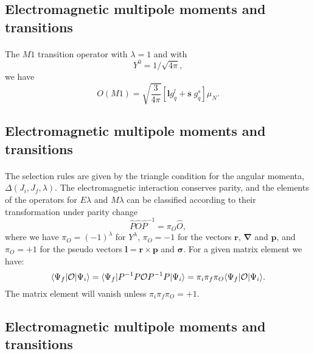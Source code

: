 \documentclass[%
twoside,                 %
final,                   %
10pt]{article}
\begin{document}
\subsection*{Electromagnetic multipole moments and transitions}

\paragraph{}
The $M1$ transition operator with $\lambda=1$ and with
\[
  Y^{0}=1/\sqrt{4\pi },
\]
we have
\[
O(M1)=\sqrt{\frac{3}{4\pi }}[\mathbf{l}g^{l }_{q}+\mathbf{s} \; g^{s}_{q}]\mu _{N}. 
\]



\subsection*{Electromagnetic multipole moments and transitions}

\paragraph{}
The selection rules are given by the triangle condition for the
angular momenta, $  \Delta (J_{i},J_{f},\lambda )  $. The electromagnetic
interaction conserves parity, and the elements of the
operators for $  E\lambda   $ and $  M\lambda   $
can be classified according to their transformation under parity
change
\[
\hat{P}\hat{O}\hat{P}^{-1}=\pi_{O}\hat{O}, 
\]
where we have $\pi _{O}=(-1)^{\lambda }$ for $Y^{\lambda }$,
$\pi _{O}=-1$ for the vectors
$\mathbf{r}$, $\mathbf{\nabla}$ and $\mathbf{p}$, and $  \pi _{O}=+1  $ for the 
pseudo vectors
$\mathbf{l}=\mathbf{r}\times\mathbf{p}$ and $\mathbf{\sigma}$. For a given matrix element we have:
\[
\langle\Psi _{f}\vert {\cal O}\vert \Psi _{i}\rangle =\langle\Psi _{f}\vert P^{-1}P{\cal O}P^{-1}P\vert \Psi _{i}\rangle=\pi _{i}\pi _{f}\pi _{O} \langle\Psi _{f}\vert {\cal O}\vert \Psi _{i}\rangle. 
\]
The matrix element will vanish unless  $\pi _{i}\pi _{f}\pi _{O}=+1$.



\subsection*{Electromagnetic multipole moments and transitions}

\end{document}
